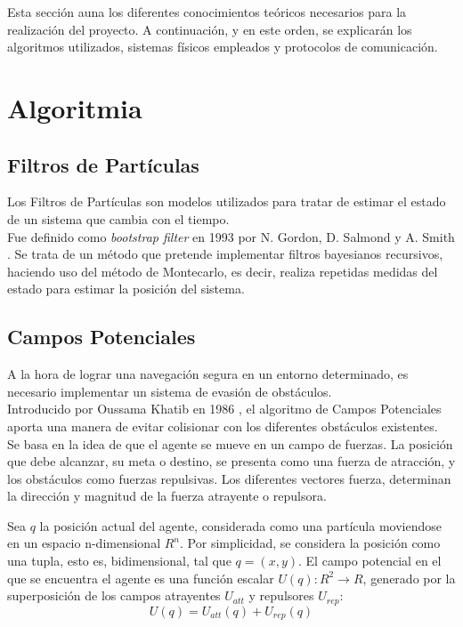 

Esta sección auna los diferentes conocimientos teóricos necesarios para la realización del proyecto. A continuación, y en este orden, se explicarán los algoritmos utilizados, sistemas físicos empleados y  protocolos de comunicación.

\section{Algoritmia}


\subsection{Filtros de Partículas}

Los Filtros de Partículas son modelos utilizados para tratar de estimar el estado de un sistema que cambia con el tiempo. 
\\Fue definido como \textit{bootstrap filter} en 1993 por N. Gordon, D. Salmond y A. Smith \citep{art:GSSPF}.  Se trata de un método que pretende implementar filtros bayesianos recursivos, haciendo uso del método de Montecarlo, es decir, realiza repetidas medidas del estado para estimar la posición del sistema.
\\ 

\subsection{Campos Potenciales}
\label{subsec:PF}
\setcounter{equation}{0}
A la hora de lograr una navegación segura en un entorno determinado, es necesario implementar un sistema de evasión de obstáculos. \\Introducido por Oussama Khatib en 1986 \citep{art:Khatib}, el algoritmo de Campos Potenciales aporta una manera de evitar colisionar con los diferentes obstáculos existentes.\\ Se basa en la idea de que el agente se mueve en un campo de fuerzas. 
La posición que debe alcanzar, su meta o destino, se presenta como una fuerza de atracción, y los obstáculos como fuerzas repulsivas. 
Los diferentes vectores fuerza, determinan la dirección y magnitud de la fuerza atrayente o repulsora.

Sea $q$ la posición actual del agente, considerada como una partícula moviendose en un espacio n-dimensional $R^n$. Por simplicidad, se considera la posición como una tupla, esto es, bidimensional, tal que $q = (x,y)$. El campo potencial en el que se encuentra el agente es una función escalar $ U(q):R^2\rightarrow R $, generado por la superposición de los campos atrayentes $U_{att}$ y repulsores $U_{rep}$:
\begin{equation}
U(q) = U_{att}(q) + U_{rep}(q)
\label{equation:Uq}
\end{equation}

